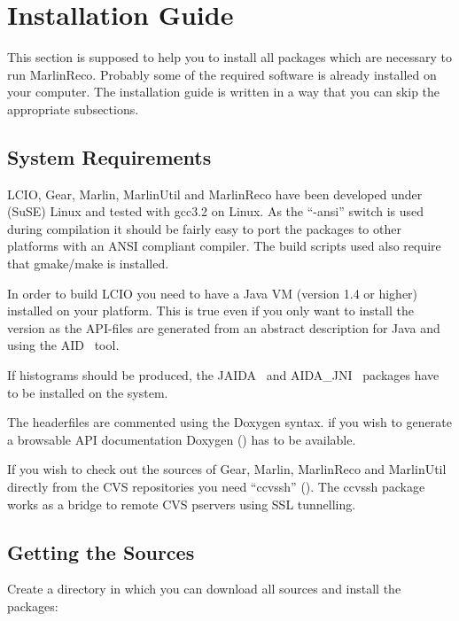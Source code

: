 \section{Installation Guide} \label{sec:install}

This section is supposed to help you to install all packages which are 
necessary to run MarlinReco. Probably some of the required software is 
already installed on your computer. The installation guide is written 
in a way that you can skip the appropriate subsections. 

\subsection{System Requirements}

LCIO, Gear, Marlin, MarlinUtil and MarlinReco have been 
developed under (SuSE) Linux and tested with gcc3.2 on Linux. 
As the ``-ansi'' switch is used during compilation
it should be fairly easy to 
port the packages to other platforms with an ANSI compliant \CPP{} compiler.
The build scripts used also require that gmake/make is installed.

In order to build LCIO you need to have a Java VM (version 1.4 or
higher) installed on your platform. This is true even if you only want
to install the \CPP{} version as the API-files are generated from an
abstract description for Java and \CPP{} using the AID~\cite{ref_aid} tool.

If histograms should be produced, the JAIDA~\cite{ref_jaida} and 
AIDA\_JNI~\cite{ref_aidajni} packages have 
to be installed on the system. 

The headerfiles are commented using the Doxygen syntax. if you wish to 
generate a browsable API documentation Doxygen 
()
has to be available.

If you wish to check out the sources of Gear, Marlin, MarlinReco
and MarlinUtil directly from the CVS repositories you need
``ccvssh''
(). 
The ccvssh package works as a bridge to remote CVS
pservers using SSL tunnelling.  

\subsection{Getting the Sources}

Create a directory in which you can download all sources and install 
the packages:

